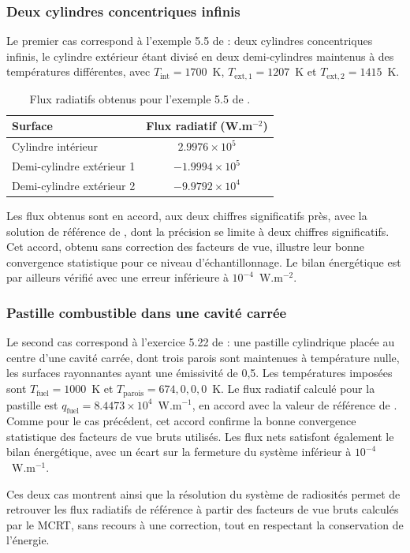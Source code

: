 \subsubsection{Deux cylindres concentriques infinis}

Le premier cas correspond à l'exemple 5.5 de \cite{howell} : deux cylindres concentriques infinis, le cylindre extérieur étant divisé en deux demi-cylindres maintenus à des températures différentes, avec $T_{\mathrm{int}}=1700$~K, $T_{\mathrm{ext},1}=1207$~K et $T_{\mathrm{ext},2}=1415$~K.

\begin{table}[H]
\centering
\begin{tabular}{lc}
\toprule
Surface & Flux radiatif (W.m$^{-2}$) \\
\midrule
Cylindre intérieur & $2.9976\times10^{5}$ \\
Demi-cylindre extérieur 1 & $-1.9994\times10^{5}$ \\
Demi-cylindre extérieur 2 & $-9.9792\times10^{4}$ \\
\bottomrule
\end{tabular}
\caption{Flux radiatifs obtenus pour l'exemple 5.5 de \cite{howell}.}
\label{tab:flux_howell55}
\end{table}

Les flux obtenus sont en accord, aux deux chiffres significatifs près, avec la solution de référence de \cite{howell}, dont la précision se limite à deux chiffres significatifs. Cet accord, obtenu sans correction des facteurs de vue, illustre leur bonne convergence statistique pour ce niveau d'échantillonnage. Le bilan énergétique est par ailleurs vérifié avec une erreur inférieure à $10^{-4}$~W.m$^{-2}$.

\subsubsection{Pastille combustible dans une cavité carrée}

Le second cas correspond à l'exercice 5.22 de \cite{howell} : une pastille cylindrique placée au centre d'une cavité carrée, dont trois parois sont maintenues à température nulle, les surfaces rayonnantes ayant une émissivité de 0,5. Les températures imposées sont $T_{\mathrm{fuel}}=1000$~K et $T_{\mathrm{parois}}=674, 0, 0, 0$~K. Le flux radiatif calculé pour la pastille est $q_{\mathrm{fuel}} = 8.4473\times10^{4}$~W.m$^{-1}$, en accord avec la valeur de référence de \cite{howell}. Comme pour le cas précédent, cet accord confirme la bonne convergence statistique des facteurs de vue bruts utilisés. Les flux nets satisfont également le bilan énergétique, avec un écart sur la fermeture du système inférieur à $10^{-4}$~W.m$^{-1}$.

Ces deux cas montrent ainsi que la résolution du système de radiosités permet de retrouver les flux radiatifs de référence à partir des facteurs de vue bruts calculés par le MCRT, sans recours à une correction, tout en respectant la conservation de l'énergie.